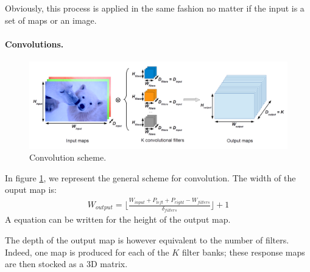 Obviously, this process is applied in the same fashion no matter if the input is a set of maps or an 
image.




\paragraph{Convolutions. }

\begin{figure}
 \begin{center}
  \includegraphics[width=16cm]{images/schema_conv.png}
 \end{center}
  \caption{
  \label{fig:conv}Convolution scheme. 
  }
\end{figure}

In figure \ref{fig:conv}, we represent the general scheme for convolution. 
The width of the ouput map is: 
\begin{align}
 W_{output} = \lfloor \frac{W_{input} + P_{left} + P_{right} - W_{filters}}{\delta_{filters}} \rfloor + 1 \nonumber
\end{align}
A equation can be written for the height of the output map. 

The depth of the output map is however equivalent to the number of filters. Indeed, one map is produced for each of the $K$ filter banks; 
these response maps are then stocked as a 3D matrix. 

